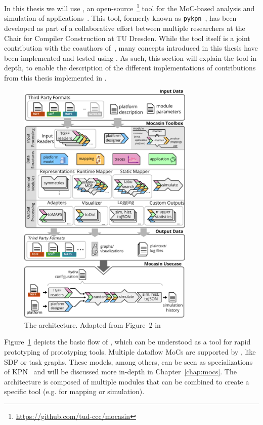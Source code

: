 In this thesis we will use \mocasin, an open-source~\footnote{\url{https://github.com/tud-ccc/mocasin}} tool for the \ac{MoC}-based analysis and simulation of applications~\cite{menard_rapido21}.
This tool, formerly known as \texttt{pykpn}~\cite{menard_norcas16,goens_mcsoc18}, has been developed as part of a collaborative effort between multiple researchers at the Chair for Compiler Construction at TU Dresden.
While the tool itself is a joint contribution with the coauthors of~\cite{menard_rapido21}, many concepts introduced in this thesis have been implemented and tested using \mocasin.
As such, this section will explain the tool in-depth, to enable the description of the different implementations of contributions from this thesis implemented in \mocasin.

\begin{figure}[h]
	\centering
   \includegraphics[width=0.75\textwidth]{figures/mocasin.pdf}
	\caption{The \mocasin architecture. Adapted from Figure~2 in \cite{menard_rapido21}}
	\label{fig:mocasin_arch}
\end{figure}


Figure~\ref{fig:mocasin_arch} depicts the basic flow of \mocasin,
which can be understood as a tool for rapid prototyping of prototyping tools.
Multiple dataflow \acp{MoC} are supported by \mocasin, like \ac{SDF} or task graphs.
These models, among others, can be seen as specializations of \ac{KPN}~\cite{lee1995dataflow} and will be discussed more in-depth in Chapter~\ref{chap:mocs}.
The \mocasin architecture is composed of multiple modules that can be combined to create a specific tool (e.g. for mapping or simulation). 

